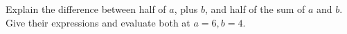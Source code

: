 Explain the difference between half of $ a $, plus $ b $, and half of the sum of $ a $ and $ b $. Give their expressions and evaluate both at $ a=6,b=4 $.
